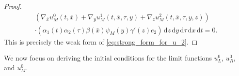 \documentclass[11pt]{article}
\def\T{\mathcal{T}}
\newcommand{\di}[1]{\,\mathrm{d}#1}
\begin{document}
\begin{proof}
\begin{multline*}
    \left( \nabla_{\overline{x}}u_M^0(t,\overline{x})+\nabla_y u_M^1(t,\overline{x},\tau,y)+\nabla_zu_M^2(t,\overline{x},\tau,y,z)\right)\\
    \cdot ( \alpha_1(t)\alpha_2(\tau)\beta(\bar x) \psi_M(y)\gamma'(z)e_2) \di{z}\di{y}\di{\tau}\di{x}\di{t}=0.
\end{multline*}
This is precisely the weak form of  \eqref{eq:strong_form_for_u_2}.
\end{proof}

We now focus on deriving the initial conditions for the limit functions $u_L^0$, $u_R^0$, and $u_M^0$.
\end{document}
